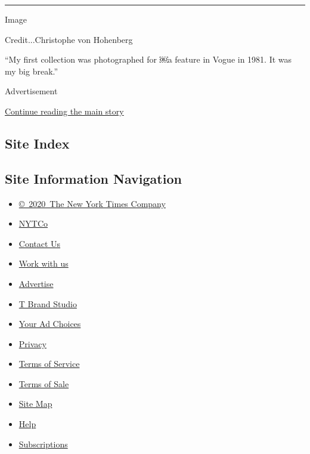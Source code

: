 \begin{center}\rule{0.5\linewidth}{\linethickness}\end{center}

Image

Credit...Christophe von Hohenberg

``My first collection was photographed for ￼a feature in Vogue in 1981.
It was my big break.''

Advertisement

\protect\hyperlink{after-bottom}{Continue reading the main story}

\hypertarget{site-index}{%
\subsection{Site Index}\label{site-index}}

\hypertarget{site-information-navigation}{%
\subsection{Site Information
Navigation}\label{site-information-navigation}}

\begin{itemize}
\tightlist
\item
  \href{https://help.nytimes3xbfgragh.onion/hc/en-us/articles/115014792127-Copyright-notice}{©~2020~The
  New York Times Company}
\end{itemize}

\begin{itemize}
\tightlist
\item
  \href{https://www.nytco.com/}{NYTCo}
\item
  \href{https://help.nytimes3xbfgragh.onion/hc/en-us/articles/115015385887-Contact-Us}{Contact
  Us}
\item
  \href{https://www.nytco.com/careers/}{Work with us}
\item
  \href{https://nytmediakit.com/}{Advertise}
\item
  \href{http://www.tbrandstudio.com/}{T Brand Studio}
\item
  \href{https://www.nytimes3xbfgragh.onion/privacy/cookie-policy\#how-do-i-manage-trackers}{Your
  Ad Choices}
\item
  \href{https://www.nytimes3xbfgragh.onion/privacy}{Privacy}
\item
  \href{https://help.nytimes3xbfgragh.onion/hc/en-us/articles/115014893428-Terms-of-service}{Terms
  of Service}
\item
  \href{https://help.nytimes3xbfgragh.onion/hc/en-us/articles/115014893968-Terms-of-sale}{Terms
  of Sale}
\item
  \href{https://spiderbites.nytimes3xbfgragh.onion}{Site Map}
\item
  \href{https://help.nytimes3xbfgragh.onion/hc/en-us}{Help}
\item
  \href{https://www.nytimes3xbfgragh.onion/subscription?campaignId=37WXW}{Subscriptions}
\end{itemize}

